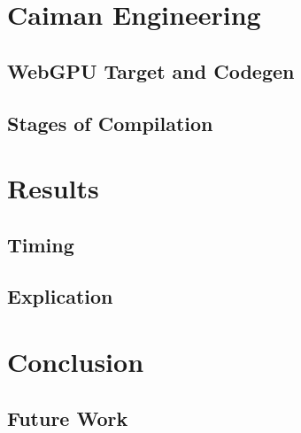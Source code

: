 \section{Caiman Engineering}
\label{sec:engineering}

\subsection{WebGPU Target and Codegen}

\subsection{Stages of Compilation}

\section{Results}
\label{sec:results}

\subsection{Timing}

\subsection{Explication}

\section{Conclusion}
\label{sec:conclusion}

\subsection{Future Work}
\label{subsec:future}